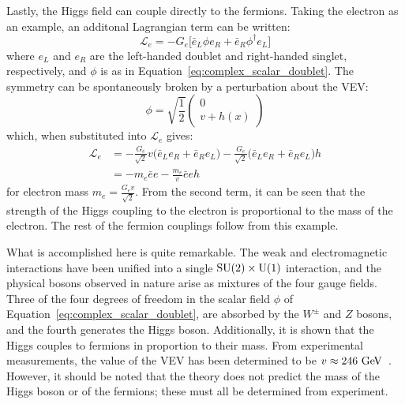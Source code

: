 Lastly, the Higgs field can couple directly to the fermions.
Taking the electron as an example, an additonal Lagrangian term can be written:
\begin{equation}
\mathcal{L}_e = -G_e \big[\bar{e}_{L}\phi e_R+\bar{e}_R\phi^{\dagger}e_L\big]
\end{equation}
where $e_L$ and $e_R$ are the left-handed doublet and right-handed singlet, respectively, and $\phi$ is as in Equation~\ref{eq:complex_scalar_doublet}.
The symmetry can be spontaneously broken by a perturbation about the VEV:
\begin{equation}
  \phi = \sqrt{\frac{1}{2}}
  \begin{pmatrix}
  0 \\ v+h(x)
  \end{pmatrix}
\end{equation}
which, when substituted into $\mathcal{L}_e$ gives:
\begin{equation}
  \begin{aligned}
    \mathcal{L}_e &= -\frac{G_e}{\sqrt{2}}v\big(\bar{e}_{L}e_{R}+\bar{e}_{R}e_{L}\big) - \frac{G_e}{\sqrt{2}}\big(\bar{e}_{L}e_{R}+\bar{e}_{R}e_{L}\big)h \\
                  &= -m_e\bar{e}e-\frac{m_e}{v}\bar{e}eh
  \end{aligned}
\end{equation}
for electron mass $m_e = \frac{G_{e}v}{\sqrt{2}}$.
From the second term, it can be seen that the strength of the Higgs coupling to the electron is proportional to the mass of the electron.
The rest of the fermion couplings follow from this example.

What is accomplished here is quite remarkable.
The weak and electromagnetic interactions have been unified into a single $\textrm{SU}(2)\times\textrm{U}(1)$ interaction, and the physical bosons observed in nature arise as mixtures of the four gauge fields.
Three of the four degrees of freedom in the scalar field $\phi$ of Equation~\ref{eq:complex_scalar_doublet}, are absorbed by the $W^{\pm}$ and $Z$ bosons, and the fourth generates the Higgs boson.
Additionally, it is shown that the Higgs couples to fermions in proportion to their mass.
From experimental measurements, the value of the VEV has been determined to be $v\approx 246\gev$~\cite{2014.pdg}.
However, it should be noted that the theory does not predict the mass of the Higgs boson or of the fermions; these must all be determined from experiment.
